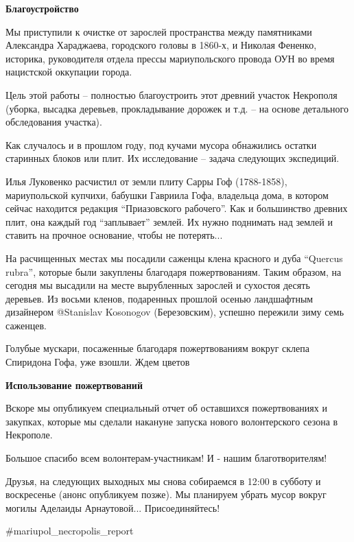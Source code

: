 \textbf{Благоустройство}

Мы приступили к очистке от зарослей пространства между памятниками Александра
Хараджаева, городского головы в 1860-х, и Николая Фененко, историка,
руководителя отдела прессы мариупольского провода ОУН во время нацистской
оккупации города.

Цель этой работы – полностью благоустроить этот древний участок Некрополя
(уборка, высадка деревьев, прокладывание дорожек и т.д. – на основе детального
обследования участка).

Как случалось и в прошлом году, под кучами мусора обнажились остатки старинных
блоков или плит. Их исследование – задача следующих экспедиций.

Илья Луковенко расчистил от земли плиту Сарры Гоф (1788-1858), мариупольской
купчихи, бабушки Гавриила Гофа, владельца дома, в котором сейчас находится
редакция \enquote{Приазовского рабочего}. Как и большинство древних плит, она каждый
год \enquote{заплывает} землей. Их нужно поднимать над землей и ставить на прочное
основание, чтобы не потерять...

На расчищенных местах мы посадили саженцы клена красного и дуба \enquote{Quercus
rubra}, которые были закуплены благодаря пожертвованиям. Таким образом, на
сегодня мы высадили на месте вырубленных зарослей и сухостоя десять деревьев.
Из восьми кленов, подаренных прошлой осенью ландшафтным дизайнером @Stanislav
Kosonogov (Березовским), успешно пережили зиму семь саженцев.

Голубые мускари, посаженные благодаря пожертвованиям вокруг склепа Спиридона
Гофа, уже взошли. Ждем цветов 🙂

\textbf{Использование пожертвований}

Вскоре мы опубликуем специальный отчет об оставшихся пожертвованиях и закупках,
которые мы сделали накануне запуска нового волонтерского сезона в Некрополе.

Большое спасибо всем волонтерам-участникам! И - нашим благотворителям!

Друзья, на следующих выходных мы снова собираемся в 12:00 в субботу и
воскресенье (анонс опубликуем позже). Мы планируем убрать мусор вокруг могилы
Аделаиды Арнаутовой... Присоединяйтесь!

\#mariupol\_necropolis\_report
